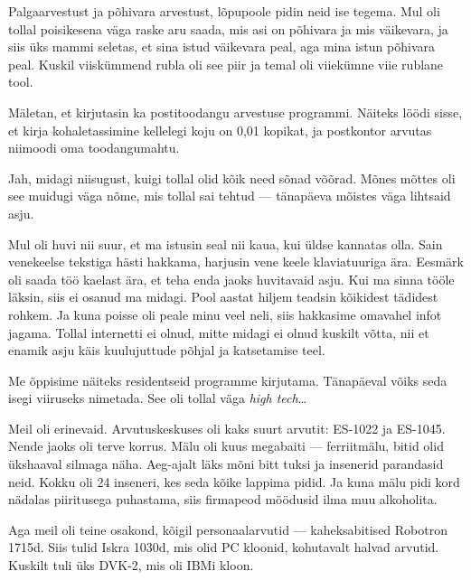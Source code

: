 
Palgaarvestust ja põhivara 
arvestust, lõpupoole pidin neid ise tegema. Mul oli tollal poisikesena väga raske aru saada, mis asi on 
põhivara ja mis väikevara, ja siis üks mammi seletas, et sina 
istud väikevara peal, aga mina istun põhivara peal. Kuskil viiskümmend 
rubla oli see piir ja temal oli viiekümne viie rublane tool. 

Mäletan, et kirjutasin ka postitoodangu arvestuse programmi. Näiteks löödi sisse, et kirja kohaletassimine kellelegi koju on 0,01 kopikat, ja 
postkontor arvutas niimoodi oma toodangumahtu. 


Jah, midagi niisugust, kuigi tollal olid kõik need sõnad võõrad. Mõnes mõttes oli see muidugi väga nõme, mis tollal sai tehtud --- tänapäeva mõistes väga lihtsaid asju. 


Mul oli huvi nii suur, et ma istusin seal nii kaua, kui üldse kannatas olla. Sain venekeelse tekstiga hästi hakkama, harjusin vene keele klaviatuuriga ära. Eesmärk oli saada töö kaelast ära, et teha enda jaoks huvitavaid asju. Kui ma sinna tööle läksin, siis ei osanud ma midagi. Pool aastat hiljem teadsin kõikidest tädidest rohkem. Ja kuna poisse oli peale minu veel neli, siis hakkasime omavahel infot jagama. Tollal internetti ei olnud, mitte midagi ei olnud kuskilt võtta, nii et enamik asju käis kuulujuttude põhjal ja katsetamise teel. 

Me õppisime näiteks residentseid programme kirjutama. Tänapäeval võiks seda 
isegi viiruseks nimetada. See oli tollal väga \emph{high tech}\ldots


Meil oli erinevaid. Arvutuskeskuses oli kaks suurt arvutit: ES-1022 ja ES-1045. Nende jaoks oli terve korrus. Mälu oli kuus megabaiti --- ferriitmälu, bitid olid ükshaaval 
silmaga näha. Aeg-ajalt läks mõni bitt tuksi ja insenerid parandasid neid. 
Kokku oli 24 inseneri, kes seda kõike lappima pidid. Ja kuna mälu 
pidi kord nädalas piiritusega puhastama, siis firmapeod möödusid ilma muu 
alkoholita.

Aga meil oli teine osakond, kõigil personaalarvutid --- 
kaheksabitised Robotron 1715d. Siis tulid 
Iskra 1030d, mis olid PC kloonid, kohutavalt halvad 
arvutid. Kuskilt tuli üks DVK-2, mis oli IBMi kloon. 


